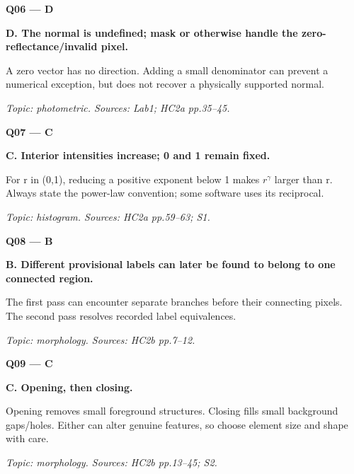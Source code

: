 \documentclass[11pt,a4paper]{article}
\begin{document}
\par\vspace{12pt}
\begin{minipage}{\linewidth}
\textbf{Q06 — D}\par\smallskip
\textbf{D. The normal is undefined; mask or otherwise handle the zero-reflectance/\allowbreak{}invalid pixel.}\par
A zero vector has no direction. Adding a small denominator can prevent a numerical exception,\allowbreak{} but does not recover a physically supported normal.\par
{\small\itshape Topic: photometric. Sources: Lab1; HC2a pp.35–45.}

\end{minipage}
\par\vspace{12pt}
\begin{minipage}{\linewidth}
\textbf{Q07 — C}\par\smallskip
\textbf{C. Interior intensities increase; 0 and 1 remain fixed.}\par
For r in (0,\allowbreak{}1),\allowbreak{} reducing a positive exponent below 1 makes \(r^{\gamma}\) larger than r. Always state the power-law convention; some software uses its reciprocal.\par
{\small\itshape Topic: histogram. Sources: HC2a pp.59–63; S1.}

\end{minipage}
\par\vspace{12pt}
\begin{minipage}{\linewidth}
\textbf{Q08 — B}\par\smallskip
\textbf{B. Different provisional labels can later be found to belong to one connected region.}\par
The first pass can encounter separate branches before their connecting pixels. The second pass resolves recorded label equivalences.\par
{\small\itshape Topic: morphology. Sources: HC2b pp.7–12.}

\end{minipage}
\par\vspace{12pt}
\begin{minipage}{\linewidth}
\textbf{Q09 — C}\par\smallskip
\textbf{C. Opening,\allowbreak{} then closing.}\par
Opening removes small foreground structures. Closing fills small background gaps/\allowbreak{}holes. Either can alter genuine features,\allowbreak{} so choose element size and shape with care.\par
{\small\itshape Topic: morphology. Sources: HC2b pp.13–45; S2.}

\end{minipage}
\end{document}
